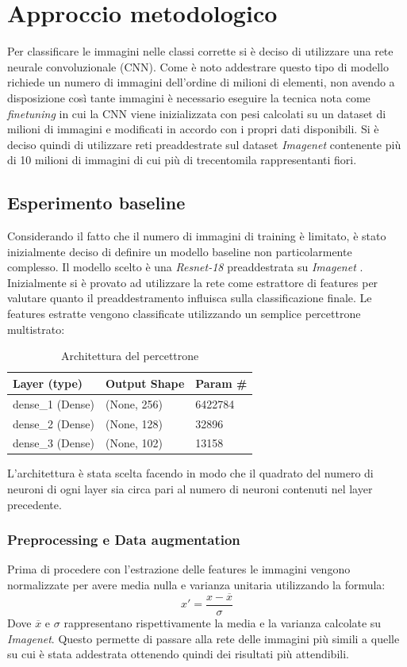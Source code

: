 \section{Approccio metodologico}
Per classificare le immagini nelle classi corrette si è deciso di utilizzare una rete neurale convoluzionale (CNN). Come è noto addestrare questo tipo di modello richiede un numero di immagini dell'ordine di milioni di elementi, non avendo a disposizione così tante immagini è necessario eseguire la tecnica nota come \textit{finetuning} in cui la CNN viene inizializzata con pesi calcolati su un dataset di milioni di immagini e modificati in accordo con i propri dati disponibili.
Si è deciso quindi di utilizzare reti preaddestrate sul dataset \textit{Imagenet} contenente più di 10 milioni di immagini di cui più di trecentomila rappresentanti fiori.
\subsection{Esperimento baseline}
Considerando il fatto che il numero di immagini di training è limitato, è stato inizialmente deciso di definire un modello baseline non particolarmente complesso. Il modello scelto è una \textit{Resnet-18} \cite{he2015deep} preaddestrata su \textit{Imagenet} \cite{5206848}. Inizialmente si è provato ad utilizzare la rete come estrattore di features per valutare quanto il preaddestramento influisca sulla classificazione finale. 
Le features estratte vengono classificate utilizzando un semplice percettrone multistrato:
\begin{table}[H]
\centering
\caption{Architettura del percettrone}
\begin{tabular}{lll}
\hline
Layer (type)     & Output Shape & Param \# \\ \hline
dense\_1 (Dense) & (None, 256)  & 6422784  \\ \hline
dense\_2 (Dense) & (None, 128)  & 32896    \\ \hline
dense\_3 (Dense) & (None, 102)  & 13158    \\ \hline
\end{tabular}
\label{t_mlp}
\end{table}
L'architettura è stata scelta facendo in modo che il quadrato del numero di neuroni di ogni layer sia circa pari al numero di neuroni contenuti nel layer precedente.

\subsubsection{Preprocessing e Data augmentation}
Prima di procedere con l'estrazione delle features le immagini vengono normalizzate per avere media nulla e varianza unitaria utilizzando la formula:
\begin{equation}
x' = \frac{x - \overline{x}}{\sigma}
\end{equation}
Dove $ \overline{x} $ e $ \sigma $ rappresentano rispettivamente la media e la varianza calcolate su \textit{Imagenet}.
Questo permette di passare alla rete delle immagini più simili a quelle su cui è stata addestrata ottenendo quindi dei risultati più attendibili.
